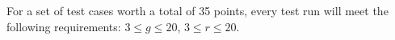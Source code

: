 For a set of test cases worth a total of 35 points, every test run will meet the following requirements: $3 \le g \le 20$, $3 \le r \le 20$.